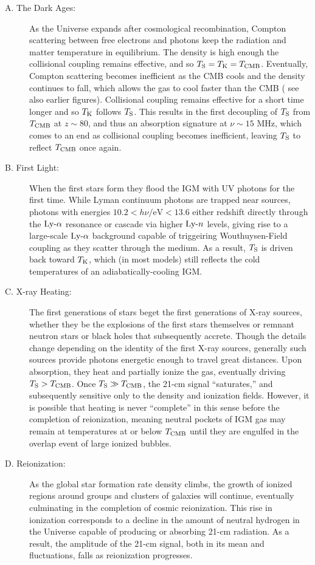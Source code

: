 \begin{description}
	\item[A. The Dark Ages:] As the Universe expands after cosmological recombination, Compton scattering between free electrons and photons keep the radiation and matter temperature in equilibrium. The density is high enough the collisional coupling remains effective, and so $T_{\text{S}} = T_{\text{K}} = T_{\text{CMB}}$. Eventually, Compton scattering becomes inefficient as the CMB cools and the density continues to fall, which allows the gas to cool faster than the CMB ({\color{red} see also earlier figures}). Collisional coupling remains effective for a short time longer and so $T_{\text{K}}$ follows $T_{\text{S}}$. This results in the first decoupling of $T_{\text{S}}$ from $T_{\text{CMB}}$ at $z \sim 80$, and thus an absorption signature at $\nu \sim 15$ MHz, which comes to an end as collisional coupling becomes inefficient, leaving $T_{\text{S}}$ to reflect $T_{\text{CMB}}$ once again.
	\item[B. First Light:] When the first stars form they flood the IGM with UV photons for the first time. While Lyman continuum photons are trapped near sources, photons with energies $10.2 < h\nu / \mathrm{eV} < 13.6$ either redshift directly through the $\text{Ly-}\alpha$ resonance or cascade via higher $\text{Ly-}n$ levels, giving rise to a large-scale $\text{Ly-}\alpha$ background capable of triggeiring Wouthuysen-Field coupling as they scatter through the medium. As a result, $T_{\text{S}}$ is driven back toward $T_{\text{K}}$, which (in most models) still reflects the cold temperatures of an adiabatically-cooling IGM.
	\item[C. X-ray Heating:] The first generations of stars beget the first generations of X-ray sources, whether they be the explosions of the first stars themselves or remnant neutron stars or black holes that subsequently accrete. Though the details change depending on the identity of the first X-ray sources, generally such sources provide photons energetic enough to travel great distances. Upon absorption, they heat and partially ionize the gas, eventually driving $T_{\text{S}} > T_{\text{CMB}}$. Once $T_{\text{S}} \gg T_{\text{CMB}}$, the 21-cm signal ``saturates,'' and subsequently sensitive only to the density and ionization fields. However, it is possible that heating is never ``complete'' in this sense before the completion of reionization, meaning neutral pockets of IGM gas may remain at temperatures at or below $T_{\text{CMB}}$ until they are engulfed in the overlap event of large ionized bubbles.
	\item[D. Reionization:] As the global star formation rate density climbs, the growth of ionized regions around groups and clusters of galaxies will continue, eventually culminating in the completion of cosmic reionization. This rise in ionization corresponds to a decline in the amount of neutral hydrogen in the Universe capable of producing or absorbing 21-cm radiation. As a result, the amplitude of the 21-cm signal, both in its mean and fluctuations, falls as reionization progresses.
\end{description}



